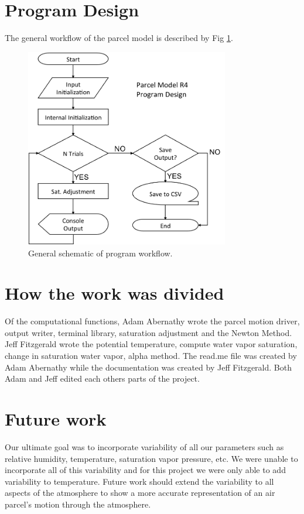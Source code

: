 \documentclass{article}
\begin{document}
\newpage
\section{Program Design}

The general workflow of the parcel model is described by Fig \ref{fig:programflow}.

\begin{center}
\begin{figure}[h]
\centering
\includegraphics[width=3.5in]{program_flow}
\caption{General schematic of program workflow.}
\label{fig:programflow}
\end{figure}
\end{center}






\newpage
\section{How the  work was divided}

Of the computational functions, Adam Abernathy wrote the parcel motion driver, output writer, terminal library, saturation adjustment and the Newton Method. Jeff Fitzgerald wrote the potential temperature, compute water vapor saturation, change in saturation water vapor, alpha method. The read.me file was created by Adam Abernathy while the documentation was created by Jeff Fitzgerald. Both Adam and Jeff edited each others parts of the project.


\newpage
\section{Future work}
Our ultimate goal was to incorporate variability of all our parameters such as relative humidity, temperature, saturation vapor pressure, etc. We were unable to incorporate all of this variability and for this project we were only able to add variability to temperature. Future work should extend the variability to all aspects of the atmosphere to show a more accurate representation of an air parcel's motion through the atmosphere.
\end{document}
